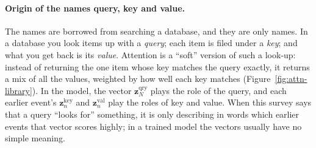 \paragraph{Origin of the names query, key and value.} The names are borrowed from searching a database,
and they are only names. In a database you look items up with a \emph{query}; each item is filed under a
\emph{key}; and what you get back is its \emph{value}. Attention is a ``soft'' version of such a look-up: instead of
returning the one item whose key matches the query exactly, it returns a mix of all the values, weighted by how well
each key matches (Figure~\ref{fig:attn-library}). In the model, the vector $\mathbf{z}^{\text{qry}}_N$ plays the role of the
query, and each earlier event's $\mathbf{z}^{\text{key}}_n$ and $\mathbf{z}^{\text{val}}_n$ play the roles of key and value. When this survey
says that a query ``looks for'' something, it is only describing in words which earlier events that vector scores
highly; in a trained model the vectors usually have no simple meaning.



